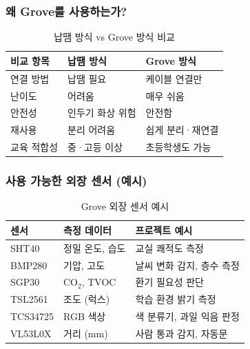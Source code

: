 \documentclass[11pt, a4paper]{article}
\begin{document}
\subsubsection{왜 Grove를 사용하는가?}

\begin{table}[H]
\centering
\begin{tabularx}{\textwidth}{l X X}
\toprule
\textbf{비교 항목} & \textbf{납땜 방식} & \textbf{Grove 방식} \\
\midrule
연결 방법 & 납땜 필요 & 케이블 연결만 \\
난이도 & 어려움 & 매우 쉬움 \\
안전성 & 인두기 화상 위험 & 안전함 \\
재사용 & 분리 어려움 & 쉽게 분리·재연결 \\
교육 적합성 & 중·고등 이상 & 초등학생도 가능 \\
\bottomrule
\end{tabularx}
\caption{납땜 방식 vs Grove 방식 비교}
\end{table}

\subsubsection{사용 가능한 외장 센서 (예시)}

\begin{table}[H]
\centering
\begin{tabularx}{\textwidth}{l l X}
\toprule
\textbf{센서} & \textbf{측정 데이터} & \textbf{프로젝트 예시} \\
\midrule
SHT40 & 정밀 온도, 습도 & 교실 쾌적도 측정 \\
BMP280 & 기압, 고도 & 날씨 변화 감지, 층수 측정 \\
SGP30 & CO$_2$, TVOC & 환기 필요성 판단 \\
TSL2561 & 조도 (럭스) & 학습 환경 밝기 측정 \\
TCS34725 & RGB 색상 & 색 분류기, 과일 익음 판정 \\
VL53L0X & 거리 (mm) & 사람 통과 감지, 자동문 \\
\bottomrule
\end{tabularx}
\caption{Grove 외장 센서 예시}
\end{table}
\end{document}
